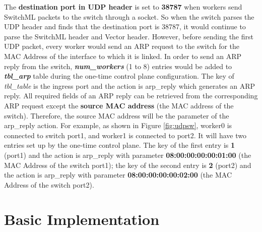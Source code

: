 \documentclass[a4paper,11pt]{article}
\begin{document}
\begin{itemize}
    The \textbf{destination port in UDP header} is set to \textbf{38787} when workers send SwitchML packets to the switch through a socket. So when the switch parses the UDP header and finds that the destination port is 38787, it would continue to parse the SwitchML header and Vector header. However, before sending the first UDP packet, every worker would send an ARP request to the switch for the MAC Address of the interface to which it is linked. In order to send an ARP reply from the switch, \textit{\textbf{num\_workers}} (1 to 8) entries would be added to \textbf{\textit{tbl\_arp}} table during the one-time control plane configuration. The key of \textit{tbl\_table} is the ingress port and the action is arp\_reply which generates an ARP reply. All required fields of an ARP reply can be retrieved from the corresponding ARP request except the \textbf{source MAC address} (the MAC address of the switch). Therefore, the source MAC address will be the parameter of the arp\_reply action. For example, as shown in Figure \ref{fig:udpsw}, worker0 is connected to switch port1, and worker1 is connected to port2. It will have two entries set up by the one-time control plane. The key of the first entry is \textbf{1} (port1) and the action is arp\_reply with parameter \textbf{08:00:00:00:00:01:00} (the MAC Address of the switch port1); the key of the second entry is \textbf{2} (port2) and the action is arp\_reply with parameter \textbf{08:00:00:00:00:02:00} (the MAC Address of the switch port2).
\end{itemize}


\section{Basic Implementation}
\end{document}

